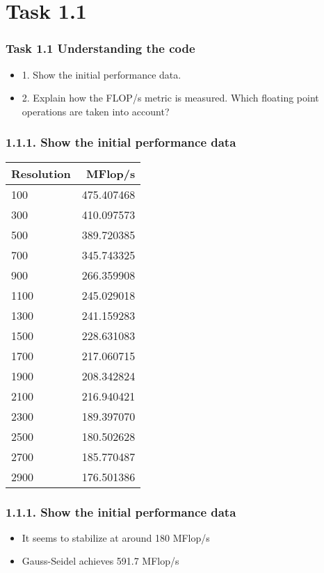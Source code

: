 \section{Task 1.1}
\begin{frame}
\frametitle{Task 1.1 Understanding the code}
\begin{itemize}
\item 1. Show the initial performance data.
\item 2. Explain how the FLOP/s metric is measured. Which floating point operations are taken into account?
\end{itemize}
\end{frame}

\begin{frame}
\frametitle{1.1.1. Show the initial performance data}
\begin{center}
  \begin{tabular}{ l | r }
    \hline
    Resolution & MFlop/s \\ \hline
    100 & 475.407468 \\ \hline
	300 & 410.097573 \\ \hline
	500 & 389.720385 \\ \hline
	700 & 345.743325 \\ \hline
	900 & 266.359908 \\ \hline
	1100 & 245.029018 \\ \hline
	1300 & 241.159283 \\ \hline
	1500 & 228.631083 \\ \hline
	1700 & 217.060715 \\ \hline
	1900 & 208.342824 \\ \hline
	2100 & 216.940421 \\ \hline
	2300 & 189.397070 \\ \hline
	2500 & 180.502628 \\ \hline
	2700 & 185.770487 \\ \hline
	2900 & 176.501386 \\ \hline
	\end{tabular}
\end{center}
\end{frame}

\begin{frame}
\frametitle{1.1.1. Show the initial performance data}
\begin{itemize}
\item It seems to stabilize at around 180 MFlop/s
\item Gauss-Seidel achieves 591.7 MFlop/s
\end{itemize}
\end{frame}

